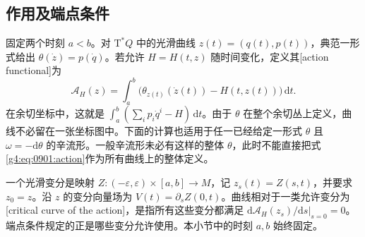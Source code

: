 \subsection{作用及端点条件}
\label{g4:subsec:0901:03}

固定两个时刻 \(a<b\)。对 \(\mathrm{T}^*Q\) 中的光滑曲线 \(z(t)=(q(t),p(t))\)，典范一形式给出 \(\theta(\dot z)=p(\dot q)\)。若允许 \(H=H(t,z)\) 随时间变化，定义其[action functional]为
\begin{equation}\label{g4:eq:0901:action}
	\mathcal A_H(z)=\int_a^b\bigl(\theta_{z(t)}(\dot z(t))-H(t,z(t))\bigr)\,\mathrm{d}t.
\end{equation}
在余切坐标中，这就是 \(\int_a^b(\sum_i p_i\dot q^i-H)\,\mathrm{d}t\)。由于 \(\theta\) 在整个余切丛上定义，曲线不必留在一张坐标图中。下面的计算也适用于任一已经给定一形式 \(\theta\) 且 \(\omega=-\mathrm{d}\theta\) 的辛流形。一般辛流形未必有这样的整体 \(\theta\)，此时不能直接把式\eqref{g4:eq:0901:action}作为所有曲线上的整体定义。

\ProseParagraphBreak

一个光滑变分是映射 \(Z:(-\varepsilon,\varepsilon)\times[a,b]\to M\)，记 \(z_s(t)=Z(s,t)\)，并要求 \(z_0=z\)。沿 \(z\) 的变分向量场为 \(V(t)=\partial_sZ(0,t)\)。曲线相对于一类允许变分为[critical curve of the action]，是指所有这些变分都满足 \(\left.\mathrm{d}\mathcal A_H(z_s)/\mathrm{d}s\right|_{s=0}=0\)。端点条件规定的正是哪些变分允许使用。本小节中的时刻 \(a,b\) 始终固定。

